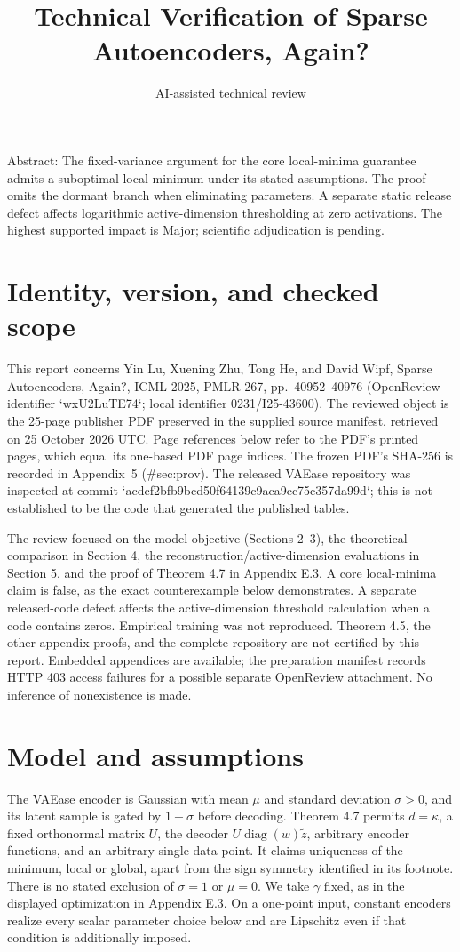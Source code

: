 \documentclass[10pt]{article}
\title{Technical Verification of
Sparse Autoencoders, Again?}
\author{AI-assisted technical review}
\date{}
\begin{document}
\maketitle
Abstract: The fixed-variance argument for the core local-minima guarantee admits a suboptimal local minimum under its stated assumptions. The proof omits the dormant branch when eliminating parameters. A separate static release defect affects logarithmic active-dimension thresholding at zero activations. The highest supported impact is Major; scientific adjudication is pending.\par
\section*{Identity, version, and checked scope}
This report concerns Yin Lu, Xuening Zhu, Tong He, and David Wipf, Sparse Autoencoders, Again?, ICML 2025, PMLR 267, pp. 40952–40976 (OpenReview identifier `wxU2LuTE74`; local identifier 0231/I25-43600). The reviewed object is the 25-page publisher PDF preserved in the supplied source manifest, retrieved on 25 October 2026 UTC. Page references below refer to the PDF’s printed pages, which equal its one-based PDF page indices. The frozen PDF’s SHA-256 is recorded in Appendix 5 (\#sec:prov). The released VAEase repository was inspected at commit `acdcf2bfb9bcd50f64139c9aca9cc75c357da99d`; this is not established to be the code that generated the published tables.\par
The review focused on the model objective (Sections 2–3), the theoretical comparison in Section 4, the reconstruction/active-dimension evaluations in Section 5, and the proof of Theorem 4.7 in Appendix E.3. A core local-minima claim is false, as the exact counterexample below demonstrates. A separate released-code defect affects the active-dimension threshold calculation when a code contains zeros. Empirical training was not reproduced. Theorem 4.5, the other appendix proofs, and the complete repository are not certified by this report. Embedded appendices are available; the preparation manifest records HTTP 403 access failures for a possible separate OpenReview attachment. No inference of nonexistence is made.\par
\section*{Model and assumptions}
The VAEase encoder is Gaussian with mean \(\mu\) and standard deviation \(\sigma>0\), and its latent sample is gated by \(1-\sigma\) before decoding. Theorem 4.7 permits \(d=\kappa\), a fixed orthonormal matrix \(U\), the decoder \(U\operatorname{diag}(w)\widetilde z\), arbitrary encoder functions, and an arbitrary single data point. It claims uniqueness of the minimum, local or global, apart from the sign symmetry identified in its footnote. There is no stated exclusion of \(\sigma=1\) or \(\mu=0\). We take \(\gamma\) fixed, as in the displayed optimization in Appendix E.3. On a one-point input, constant encoders realize every scalar parameter choice below and are Lipschitz even if that condition is additionally imposed.\par
\end{document}

